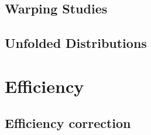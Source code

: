 \subsection{Warping Studies}

\subsection{Unfolded Distributions}


\section{Efficiency}

\subsection{Efficiency correction}
